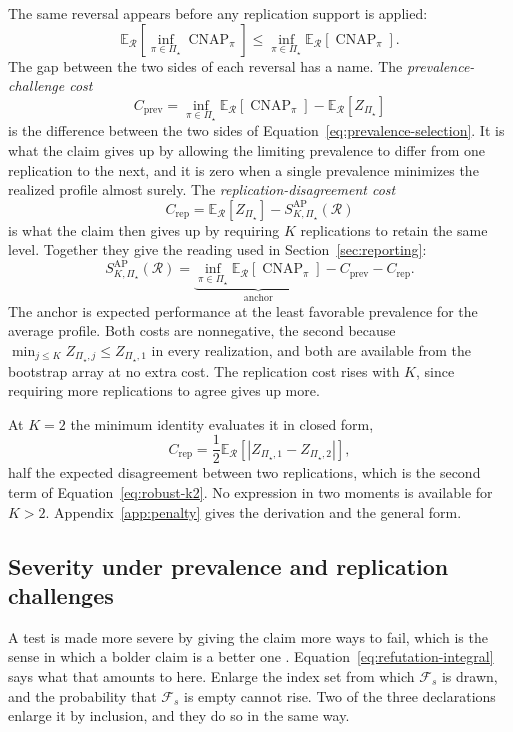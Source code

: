 \documentclass[11pt]{article}
\newcommand{\CNAP}{\operatorname{CNAP}}
\newcommand{\Regime}{\mathcal{R}}
\newcommand{\PSet}{\Pi_\star}
\newcommand{\E}{\mathbb{E}}
\newcommand{\SRob}{S_{K,\PSet}^{\mathrm{AP}}(\Regime)}
\newcommand{\RefSet}{\mathcal{F}}
\theoremstyle{remark}
\begin{document}
The same reversal appears before any replication support is applied:
\begin{equation}
\E_{\Regime}
\left[
\inf_{\pi\in\PSet}\CNAP_\pi
\right]
\leq
\inf_{\pi\in\PSet}
\E_{\Regime}
\left[
\CNAP_\pi
\right].
\label{eq:prevalence-selection}
\end{equation}
The gap between the two sides of each reversal has a name. The \emph{prevalence-challenge cost}
\[
C_{\mathrm{prev}}
=
\inf_{\pi\in\PSet}\E_{\Regime}[\CNAP_\pi]
-
\E_{\Regime}[Z_{\PSet}]
\]
is the difference between the two sides of Equation~\eqref{eq:prevalence-selection}. It is what the claim gives up by allowing the limiting prevalence to differ from one replication to the next, and it is zero when a single prevalence minimizes the realized profile almost surely. The \emph{replication-disagreement cost}
\[
C_{\mathrm{rep}}
=
\E_{\Regime}\left[Z_{\PSet}\right]
-
\SRob
\]
is what the claim then gives up by requiring $K$ replications to retain the same level. Together they give the reading used in Section~\ref{sec:reporting}:
\begin{equation}
\SRob
=
\underbrace{\inf_{\pi\in\PSet}\E_{\Regime}[\CNAP_\pi]}_{\text{anchor}}
-
C_{\mathrm{prev}}
-
C_{\mathrm{rep}}.
\label{eq:two-costs}
\end{equation}
The anchor is expected performance at the least favorable prevalence for the average profile. Both costs are nonnegative, the second because $\min_{j\leq K}Z_{\PSet,j}\leq Z_{\PSet,1}$ in every realization, and both are available from the bootstrap array at no extra cost. The replication cost rises with $K$, since requiring more replications to agree gives up more.

At $K=2$ the minimum identity evaluates it in closed form,
\[
C_{\mathrm{rep}}
=
\frac12
\E_{\Regime}
\left[
|Z_{\PSet,1}-Z_{\PSet,2}|
\right],
\]
half the expected disagreement between two replications, which is the second term of Equation~\eqref{eq:robust-k2}. No expression in two moments is available for $K>2$. Appendix~\ref{app:penalty} gives the derivation and the general form.

\subsection{Severity under prevalence and replication challenges}
\label{sec:severity}

A test is made more severe by giving the claim more ways to fail, which is the sense in which a bolder claim is a better one \cite{popper1963conjectures}. Equation~\eqref{eq:refutation-integral} says what that amounts to here. Enlarge the index set from which $\RefSet_s$ is drawn, and the probability that $\RefSet_s$ is empty cannot rise. Two of the three declarations enlarge it by inclusion, and they do so in the same way.
\end{document}
